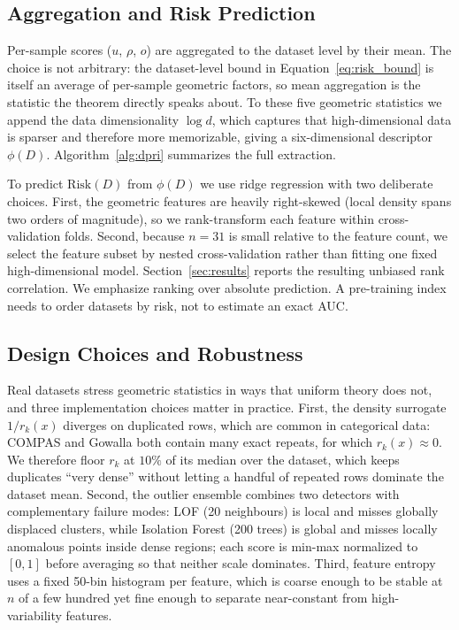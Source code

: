 \subsection{Aggregation and Risk Prediction}
\label{sec:aggregation}

Per-sample scores ($u$, $\rho$, $o$) are aggregated to the dataset level
by their mean. The choice is not arbitrary: the dataset-level bound in
Equation~\eqref{eq:risk_bound} is itself an average of per-sample
geometric factors, so mean aggregation is the statistic the theorem
directly speaks about. To these five geometric statistics we append the
data dimensionality $\log d$, which captures that high-dimensional data
is sparser and therefore more memorizable, giving a six-dimensional
descriptor $\phi(D)$. Algorithm~\ref{alg:dpri} summarizes the full
extraction.

To predict $\mathrm{Risk}(D)$ from $\phi(D)$ we use ridge regression with two
deliberate choices. First, the geometric features are heavily right-skewed
(local density spans two orders of magnitude), so we rank-transform each
feature within cross-validation folds. Second, because $n=31$ is small
relative to the feature count, we select the feature subset by nested
cross-validation rather than fitting one fixed high-dimensional model.
Section~\ref{sec:results} reports the resulting unbiased rank correlation.
We emphasize ranking over absolute prediction. A pre-training index needs to
order datasets by risk, not to estimate an exact AUC.

\subsection{Design Choices and Robustness}
\label{sec:design}

Real datasets stress geometric statistics in ways that uniform theory
does not, and three implementation choices matter in practice. First,
the density surrogate $1/r_k(x)$ diverges on duplicated rows, which are
common in categorical data: COMPAS and Gowalla both contain many exact
repeats, for which $r_k(x) \approx 0$. We therefore floor $r_k$ at
$10\%$ of its median over the dataset, which keeps duplicates ``very
dense'' without letting a handful of repeated rows dominate the dataset
mean. Second, the outlier ensemble combines two detectors with
complementary failure modes: LOF (20 neighbours) is local and misses
globally displaced clusters, while Isolation Forest (200 trees) is
global and misses locally anomalous points inside dense regions;
each score is min-max normalized to $[0,1]$ before averaging so that
neither scale dominates. Third, feature entropy uses a fixed 50-bin
histogram per feature, which is coarse enough to be stable at
$n$ of a few hundred yet fine enough to separate near-constant from
high-variability features.

